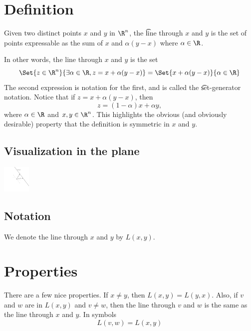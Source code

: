 
\section*{Definition}

Given two distinct points $x$ and $y$ in $\R ^n$, the \t{line} through $x$ and $y$ is the set of points expressable as the sum of $x$ and $\alpha (y-x)$ where $\alpha  \in \R $.

In other words, the line through $x$ and $y$ is the set
\[
\Set{z \in \R ^n}{\exists  \alpha  \in \R , z = x + \alpha (y - x)} = \Set{x + \alpha (y-x)}{\alpha  \in \R }
\]
The second expression is notation for the first, and is called the \t{set-generator notation}.
Notice that if $z = x + \alpha (y-x)$, then
\[
z = (1 - \alpha )x + \alpha y,
\]
where $\alpha  \in \R $ and $x, y \in \R ^n$.
This highlights the obvious (and obviously desirable) property that the definition is symmetric in $x$ and $y$.

\subsection*{Visualization in the plane}

\begin{center}\includegraphics[width=0.100\textwidth]{./graphics/L(x-y).pdf}\end{center}
\subsection*{Notation}

We denote the line through $x$ and $y$ by $L(x,y)$.

\section*{Properties}

There are a few nice properties.
If $x \neq y$, then $L(x, y) = L(y, x)$.
Also, if $v$ and $w$ are in $L(x, y)$ and $v \neq w$, then the line through $v$ and $w$ is the same as the line through $x$ and $y$.
In symbols
\[
L(v, w) = L(x, y)
\]

\blankpage